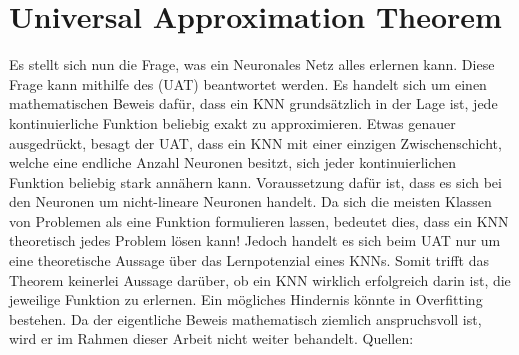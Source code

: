\section{Universal Approximation Theorem}\label{sec:UAT}
Es stellt sich nun die Frage, was ein Neuronales Netz alles erlernen kann.
Diese Frage kann mithilfe des  (UAT)
beantwortet werden. Es handelt sich um einen mathematischen Beweis dafür, dass ein KNN
grundsätzlich in der Lage ist, jede kontinuierliche Funktion beliebig exakt zu
approximieren.
\para{}
Etwas genauer ausgedrückt, besagt der UAT, dass ein KNN mit einer einzigen
Zwischenschicht, welche eine endliche Anzahl Neuronen besitzt, sich jeder kontinuierlichen
Funktion beliebig stark annähern kann. Voraussetzung dafür ist, dass es sich bei den
Neuronen um nicht-lineare Neuronen handelt.
Da sich die meisten Klassen von Problemen als eine Funktion formulieren
lassen, bedeutet dies, dass ein KNN theoretisch jedes Problem lösen kann!
Jedoch handelt es sich beim UAT nur um eine theoretische
Aussage über das Lernpotenzial eines KNNs. Somit trifft das Theorem keinerlei Aussage
darüber, ob ein KNN wirklich erfolgreich darin ist, die jeweilige Funktion zu erlernen.
Ein mögliches Hindernis könnte in Overfitting bestehen.
\para{}
Da der eigentliche Beweis mathematisch ziemlich anspruchsvoll ist, wird er im
Rahmen dieser Arbeit nicht weiter behandelt.
\para{}
Quellen: \cite{Nielsen} \cite{wiki:uat}


\pagebreak
